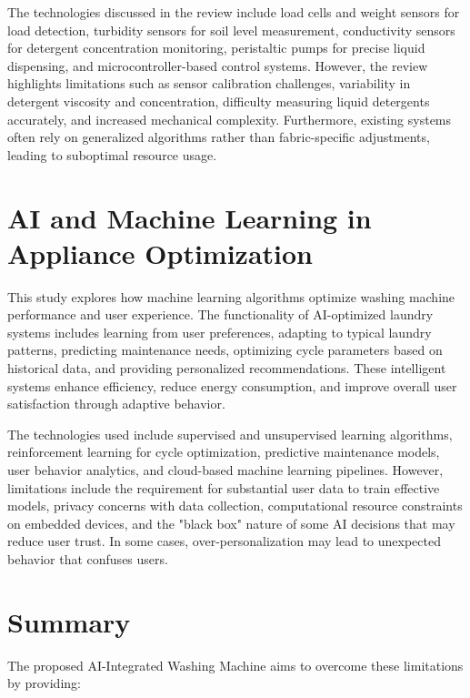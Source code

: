 \noindent
The technologies discussed in the review include load cells and weight sensors for load detection, turbidity sensors for soil level measurement, conductivity sensors for detergent concentration monitoring, peristaltic pumps for precise liquid dispensing, and microcontroller-based control systems. However, the review highlights limitations such as sensor calibration challenges, variability in detergent viscosity and concentration, difficulty measuring liquid detergents accurately, and increased mechanical complexity. Furthermore, existing systems often rely on generalized algorithms rather than fabric-specific adjustments, leading to suboptimal resource usage.

\section{AI and Machine Learning in Appliance Optimization}

This study explores how machine learning algorithms optimize washing machine performance and user experience. The functionality of AI-optimized laundry systems includes learning from user preferences, adapting to typical laundry patterns, predicting maintenance needs, optimizing cycle parameters based on historical data, and providing personalized recommendations. These intelligent systems enhance efficiency, reduce energy consumption, and improve overall user satisfaction through adaptive behavior.

\noindent
The technologies used include supervised and unsupervised learning algorithms, reinforcement learning for cycle optimization, predictive maintenance models, user behavior analytics, and cloud-based machine learning pipelines. However, limitations include the requirement for substantial user data to train effective models, privacy concerns with data collection, computational resource constraints on embedded devices, and the "black box" nature of some AI decisions that may reduce user trust. In some cases, over-personalization may lead to unexpected behavior that confuses users.

\section{Summary}

The proposed AI-Integrated Washing Machine aims to overcome these limitations by providing:


